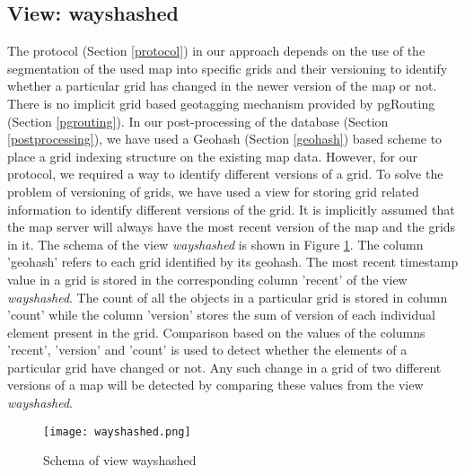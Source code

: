 


\subsection{View: wayshashed}
The protocol (Section \ref{protocol}) in our approach depends on the use of the segmentation of the used map into specific grids and their versioning to identify whether a particular grid has changed in the newer version of the map or not. There is no implicit grid based geotagging mechanism provided by pgRouting (Section \ref{pgrouting}). In our post-processing of the database (Section \ref{postprocessing}), we have used a Geohash (Section \ref{geohash}) based scheme to place a grid indexing structure on the existing map data. However, for our protocol, we required a way to identify different versions of a grid. To solve the problem of versioning of grids, we have used a view for storing grid related information to identify different versions of the grid. It is implicitly assumed that the map server will always have the most recent version of the map and the grids in it. The schema of the view \textit{wayshashed} is shown in Figure \ref{fg:wayshashed}. The column 'geohash' refers to each grid identified by its geohash. The most recent timestamp value in a grid is stored in the corresponding column 'recent' of the view \textit{wayshashed}. The count of all the objects in a particular grid is stored in column 'count' while the column 'version' stores the sum of version of each individual element present in the grid. Comparison based on the values of the columns 'recent', 'version' and 'count' is used to detect whether the elements of a particular grid have changed or not. Any such change in a grid of two different versions of a map will be detected by comparing these values from the view \textit{wayshashed}.
\begin{figure}
\centering
\texttt{[image: wayshashed.png]}
\caption{Schema of view wayshashed}
\label{fg:wayshashed}
\end{figure}



